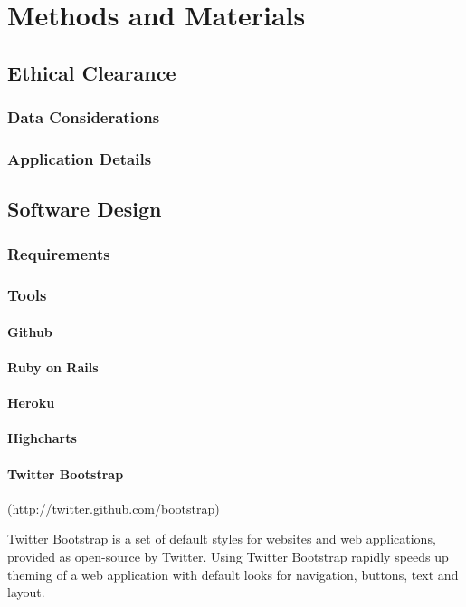 \section{Methods and Materials}
\subsection{Ethical Clearance}
\subsubsection{Data Considerations}
\subsubsection{Application Details}

\subsection{Software Design}
\subsubsection{Requirements}
\subsubsection{Tools}
\paragraph{Github}
\paragraph{Ruby on Rails}
\paragraph{Heroku}
\paragraph{Highcharts}
\paragraph{Twitter Bootstrap}
(\url{http://twitter.github.com/bootstrap})

Twitter Bootstrap is a set of default styles for websites and web applications, provided as open-source by Twitter. Using Twitter Bootstrap rapidly speeds up theming of a web application with default looks for navigation, buttons, text and layout.

